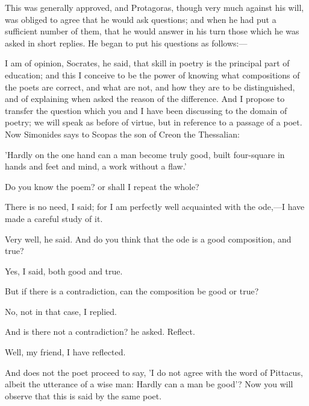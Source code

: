 \documentclass[11pt,letter]{article}
\begin{document}
\par  This was generally approved, and Protagoras, though very much against his will, was obliged to agree that he would ask questions; and when he had put a sufficient number of them, that he would answer in his turn those which he was asked in short replies. He began to put his questions as follows:—

\par  I am of opinion, Socrates, he said, that skill in poetry is the principal part of education; and this I conceive to be the power of knowing what compositions of the poets are correct, and what are not, and how they are to be distinguished, and of explaining when asked the reason of the difference. And I propose to transfer the question which you and I have been discussing to the domain of poetry; we will speak as before of virtue, but in reference to a passage of a poet. Now Simonides says to Scopas the son of Creon the Thessalian:

\par  'Hardly on the one hand can a man become truly good, built four-square in hands and feet and mind, a work without a flaw.'

\par  Do you know the poem? or shall I repeat the whole?

\par  There is no need, I said; for I am perfectly well acquainted with the ode,—I have made a careful study of it.

\par  Very well, he said. And do you think that the ode is a good composition, and true?

\par  Yes, I said, both good and true.

\par  But if there is a contradiction, can the composition be good or true?

\par  No, not in that case, I replied.

\par  And is there not a contradiction? he asked. Reflect.

\par  Well, my friend, I have reflected.

\par  And does not the poet proceed to say, 'I do not agree with the word of Pittacus, albeit the utterance of a wise man: Hardly can a man be good'? Now you will observe that this is said by the same poet.
\end{document}
